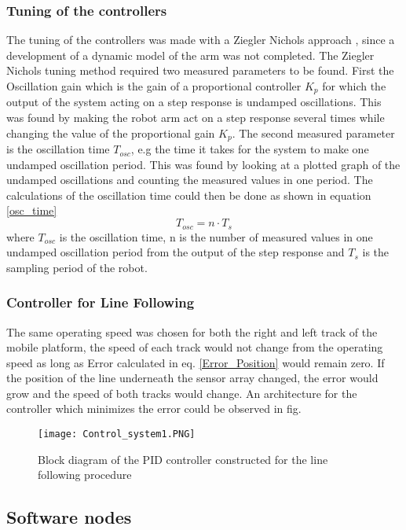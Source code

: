 \subsubsection{Tuning of the controllers}
The tuning of the controllers was made with a Ziegler Nichols approach \parencite{FeedbackControl}, since a development of a dynamic model of the arm was not completed. The Ziegler Nichols tuning method required two measured parameters to be found. First the Oscillation gain which is the gain of a proportional controller \(K_p\) for which the output of the system acting on a step response is undamped oscillations. This was found by making the robot arm act on a step response several times while changing the value of the proportional gain \(K_p\). The second measured parameter is the oscillation time \(T_{osc}\), e.g the time it takes for the system to make one undamped oscillation period. This was found by looking at a plotted graph of the undamped oscillations and counting the measured values in one period. The calculations of the oscillation time could then be done as shown in equation \ref{osc_time}
\begin{equation}
    T_{osc} = n\cdot T_s
    \label{osc_time}
\end{equation}
where \(T_{osc}\) is the oscillation time, n is the number of measured values in one undamped oscillation period from the output of the step response and \(T_s\) is the sampling period of the robot.

\subsubsection{Controller for Line Following}
The same operating speed was chosen for both the right and left track of the mobile platform, the speed of each track would not change from the operating speed as long as Error calculated in eq. \ref{Error_Position} would remain zero. If the position of the line underneath the sensor array changed, the error would grow and the speed of both tracks would change. An architecture for the controller which minimizes the error could be observed in fig. 

\begin{figure}[H]
    \centering
    \texttt{[image: Control\_system1.PNG]}
    \caption{Block diagram of the PID controller constructed for the line following procedure}
    \label{Control_system1}
\end{figure}
              
   
\subsection{Software nodes}

